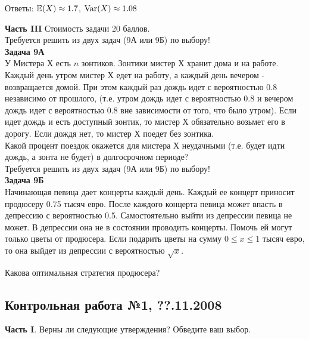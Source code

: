\documentclass[12pt, a4paper]{article}\usepackage[]{graphicx}\usepackage[]{color}
\begin{document}
	Ответы: $\mathbb{E}(X)\approx 1.7$, $\operatorname{Var}(X)\approx 1.08$


	\textbf{Часть III} Стоимость задачи 20 баллов. \\

	Требуется решить \textbf{} из двух задач (9А или 9Б) по
	выбору! \\

	\textbf{Задача 9А} \\
	У Мистера Х есть $n$ зонтиков. Зонтики мистер Х хранит дома и на работе. Каждый день утром мистер Х едет на работу, а каждый день вечером - возвращается домой. При этом каждый раз дождь идет с вероятностью 0.8 независимо от прошлого, (т.е. утром дождь идет с вероятностью 0.8 и вечером дождь идет с вероятностью 0.8 вне зависимости от того, что было утром). Если идет дождь и есть доступный зонтик, то мистер Х обязательно возьмет его в дорогу. Если дождя нет, то мистер Х поедет без зонтика. \\
	Какой процент поездок окажется для мистера Х неудачными (т.е. будет идти дождь, а зонта не будет) в долгосрочном периоде? \\

	Требуется решить \textbf{} из двух задач (9А или 9Б) по
	выбору! \\

	\textbf{Задача 9Б} \\
	Начинающая певица дает концерты каждый день. Каждый ее концерт приносит продюсеру 0.75 тысяч евро. После каждого концерта певица может впасть в депрессию с вероятностью 0.5. Самостоятельно выйти из депрессии певица не может. В депрессии она не в состоянии проводить концерты. Помочь ей могут только цветы от продюсера. Если подарить цветы на сумму $0\le x\le 1$ тысяч евро, то она выйдет из депрессии с вероятностью $\sqrt{x}$.

	Какова оптимальная стратегия продюсера?


	\subsection{Контрольная работа №1, ??.11.2008}

	\textbf{Часть I}. Верны ли следующие утверждения? Обведите ваш выбор. \\
\end{document}
